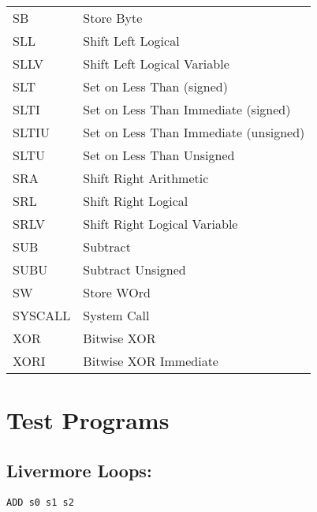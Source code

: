 \documentclass[11pt]{article}
\begin{document}
\begin{longtable}{l|l}
SB & Store Byte\\
SLL & Shift Left Logical\\
SLLV & Shift Left Logical Variable\\
SLT & Set on Less Than (signed)\\
SLTI & Set on Less Than Immediate (signed)\\
SLTIU & Set on Less Than Immediate (unsigned)\\
SLTU & Set on Less Than Unsigned\\
SRA & Shift Right Arithmetic\\
SRL & Shift Right Logical\\
SRLV & Shift Right Logical Variable\\
SUB & Subtract\\
SUBU & Subtract Unsigned\\
SW & Store WOrd\\
SYSCALL & System Call\\
XOR & Bitwise XOR\\
XORI & Bitwise XOR Immediate\\
\end{longtable}

\section{Test Programs}
\label{sec:org10dcb1b}
\subsection{Livermore Loops:}
\label{sec:orgd1a8b9c}
\begin{verbatim}
ADD s0 s1 s2
\end{verbatim}
\end{document}
